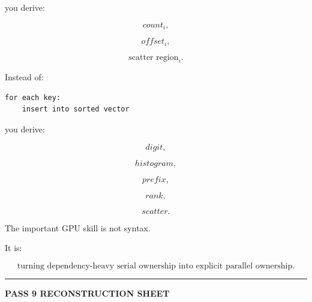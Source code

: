 you derive:

\[
count_i,
\]

\[
offset_i,
\]

\[
\text{scatter region}_i.
\]

Instead of:

\protect{}\label{qfd2y3}%
\begin{verbatim}
for each key:
    insert into sorted vector
\end{verbatim}

you derive:

\[
digit,
\]

\[
histogram,
\]

\[
prefix,
\]

\[
rank,
\]

\[
scatter.
\]

The important GPU skill is not syntax.

It is:

\[
\boxed{
\text{turning dependency-heavy serial ownership into explicit parallel ownership}.
}
\]

\begin{center}\rule{0.5\linewidth}{0.5pt}\end{center}

\textbf{PASS 9 RECONSTRUCTION SHEET}

